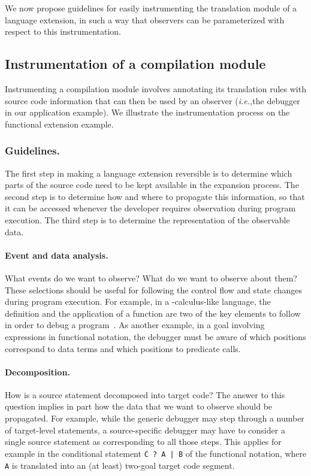 \documentclass[preprint]{llncs}
\newcommand{\ie}{\emph{i.e.,\xspace}}
\newcommand{\pre}[1]{\texttt{#1}}
\begin{document}
We now propose guidelines for easily instrumenting the translation
module of a language extension, in such a way that observers can be
parameterized with respect to this instrumentation.

\subsection{Instrumentation of a compilation module}

Instrumenting a compilation module involves annotating its translation rules
with source code information that can then be used by an observer (\ie the
debugger in our application example). 
We illustrate the instrumentation process on the functional extension
example.

\subsubsection{Guidelines.}

The first step in making a language extension reversible is to determine which
parts of the source code need to be kept available in the expansion process.
The second step is to determine how and where to propagate this information,
so that it can be  accessed whenever the developer requires observation during 
program execution. The third step is to determine the representation of the 
observable data.

\paragraph{Event and data analysis.} What events do we want to
observe? What do we want to observe about them? These selections
should be useful for following the control flow and state changes
during program execution. For example, in a -calculus-like
language, the definition and the application of a function are two of
the key elements to follow in order to debug a
program~\cite{tolmach}. As another example, in a goal involving
expressions in functional notation, the debugger must be aware of
which positions correspond to data terms and which positions to
predicate calls.

\paragraph{Decomposition.} How is a source statement decomposed into
target code? The answer to this question implies in part how the data
that we want to observe should be propagated. For example, while the
generic debugger may step through a number of target-level statements,
a source-specific debugger may have to consider a single source
statement as corresponding to all those steps. This applies for
example in the conditional statement \pre{C ? A | B} of the functional
notation, where \pre{A} is translated into an (at least) two-goal
target code segment.
\end{document}
